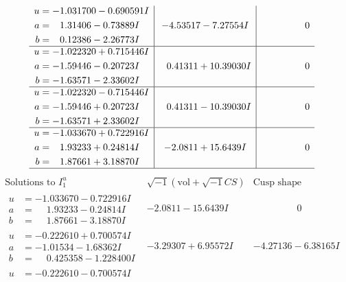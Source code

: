 \documentclass[1p]{elsarticle_modified}
\theoremstyle{definition}
\newcommand{\I}{\sqrt{-1}}
\begin{document}
$$\begin{array}{c|c|c}
\begin{aligned}
u &= -1.031700 - 0.690591 I \\
a &= \phantom{-}1.31406 - 0.73889 I \\
b &= \phantom{-}0.12386 - 2.26773 I\end{aligned}
 & -4.53517 - 7.27554 I & \phantom{-0.000000 } 0 \\ \hline\begin{aligned}
u &= -1.022320 + 0.715446 I \\
a &= -1.59446 - 0.20723 I \\
b &= -1.63571 - 2.33602 I\end{aligned}
 & \phantom{-}0.41311 + 10.39030 I & \phantom{-0.000000 } 0 \\ \hline\begin{aligned}
u &= -1.022320 - 0.715446 I \\
a &= -1.59446 + 0.20723 I \\
b &= -1.63571 + 2.33602 I\end{aligned}
 & \phantom{-}0.41311 - 10.39030 I & \phantom{-0.000000 } 0 \\ \hline\begin{aligned}
u &= -1.033670 + 0.722916 I \\
a &= \phantom{-}1.93233 + 0.24814 I \\
b &= \phantom{-}1.87661 + 3.18870 I\end{aligned}
 & -2.0811 + 15.6439 I & \phantom{-0.000000 } 0\\
 \hline 
 \end{array}$$\newpage$$\begin{array}{c|c|c}  
\text{Solutions to }I^u_{1}& \I (\text{vol} + \sqrt{-1}CS) & \text{Cusp shape}\\
 \hline 
\begin{aligned}
u &= -1.033670 - 0.722916 I \\
a &= \phantom{-}1.93233 - 0.24814 I \\
b &= \phantom{-}1.87661 - 3.18870 I\end{aligned}
 & -2.0811 - 15.6439 I & \phantom{-0.000000 } 0 \\ \hline\begin{aligned}
u &= -0.222610 + 0.700574 I \\
a &= -1.01534 - 1.68362 I \\
b &= \phantom{-}0.425358 - 1.228400 I\end{aligned}
 & -3.29307 + 6.95572 I & -4.27136 - 6.38165 I \\ \hline\begin{aligned}
u &= -0.222610 - 0.700574 I \\

\end{aligned}
\end{array}$$
\end{document}
